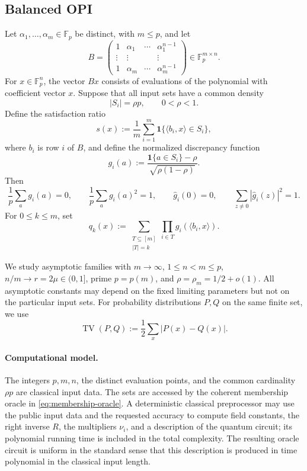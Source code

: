 \documentclass[10pt,a4paper]{amsart}
\newcommand{\F}{\mathbb{F}}
\newcommand{\TV}{\operatorname{TV}}
\newcommand{\abs}[1]{\left\lvert #1\right\rvert}
\newcommand{\one}{\mathbf{1}}
\begin{document}
\subsection{Balanced OPI}

Let $\alpha_1,\ldots,\alpha_m\in\F_p$ be distinct, with $m\le p$, and let
\begin{equation}
   B=\begin{pmatrix}
      1&\alpha_1&\cdots&\alpha_1^{n-1}\\
      \vdots&\vdots&&\vdots\\
      1&\alpha_m&\cdots&\alpha_m^{n-1}
   \end{pmatrix}\in\F_p^{m\times n}.
   \label{eq:vandermonde}
\end{equation}
For $x\in\F_p^n$, the vector $Bx$ consists of evaluations of the polynomial with coefficient vector $x$.  Suppose that all input sets have a common density
\[
   \abs{S_i}=\rho p,
   \qquad 0<\rho<1.
\]
Define the satisfaction ratio
\begin{equation}
   s(x):=\frac1m\sum_{i=1}^m\one\{\langle b_i,x\rangle\in S_i\},
   \label{eq:score}
\end{equation}
where $b_i$ is row $i$ of $B$, and define the normalized discrepancy function
\begin{equation}
   g_i(a):=\frac{\one\{a\in S_i\}-\rho}{\sqrt{\rho(1-\rho)}}.
   \label{eq:gi}
\end{equation}
Then
\begin{equation}
   \frac1p\sum_a g_i(a)=0,
   \qquad
   \frac1p\sum_a g_i(a)^2=1,
   \qquad
   \widehat g_i(0)=0,
   \qquad
   \sum_{z\ne0}\abs{\widehat g_i(z)}^2=1.
   \label{eq:gi-properties}
\end{equation}
For $0\le k\le m$, set
\begin{equation}
   q_k(x):=\sum_{\substack{T\subseteq[m]\\\abs{T}=k}}
              \prod_{i\in T}g_i(\langle b_i,x\rangle).
   \label{eq:qk}
\end{equation}

We study asymptotic families with $m\to\infty$, $1\le n<m\le p$, $n/m\to r=2\mu\in(0,1]$, prime $p=p(m)$, and $\rho=\rho_m=1/2+o(1)$.  All asymptotic constants may depend on the fixed limiting parameters but not on the particular input sets.  For probability distributions $P,Q$ on the same finite set, we use
\[
   \TV(P,Q):=\frac12\sum_x\abs{P(x)-Q(x)}.
\]

\paragraph{Computational model.}
The integers $p,m,n$, the distinct evaluation points, and the common cardinality $\rho p$ are classical input data.  The sets are accessed by the coherent membership oracle in \cref{eq:membership-oracle}.  A deterministic classical preprocessor may use the public input data and the requested accuracy to compute field constants, the right inverse $R$, the multipliers $\nu_i$, and a description of the quantum circuit; its polynomial running time is included in the total complexity.  The resulting oracle circuit is uniform in the standard sense that this description is produced in time polynomial in the classical input length.
\end{document}
